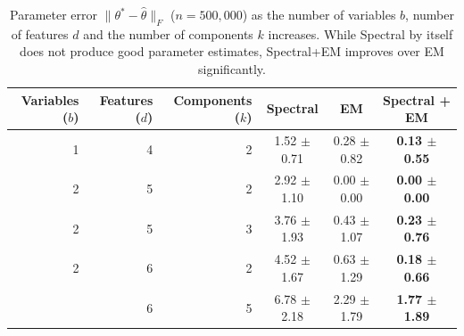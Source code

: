 \begin{table}[p]
\caption{Parameter error $\|\theta^* - \hat \theta\|_F$ ($n = 500,000$)
as the number of variables $b$, number of features $d$ and the number of components $k$ increases.
While Spectral by itself does not produce good parameter estimates, Spectral+EM improves
over EM significantly.
}
\label{tbl:parameter-recovery}
\vskip 0.15in
\begin{center}
\begin{small}
\begin{sc}

  \begin{tabular}{ r r r c c c }
\hline
\abovespace\belowspace
Variables ($b$) & Features ($d$) & Components ($k$) & Spectral & EM & Spectral + EM \\
\hline
\abovespace
  1 & 4 & 2 & 1.52 $\pm$ 0.71 & 0.28 $\pm$ 0.82 & {\bf 0.13 $\pm$ 0.55} \\
  2 & 5 & 2 & 2.92 $\pm$ 1.10 & 0.00 $\pm$ 0.00 & {\bf 0.00 $\pm$ 0.00} \\
  2 & 5 & 3 & 3.76 $\pm$ 1.93 & 0.43 $\pm$ 1.07 & {\bf 0.23 $\pm$ 0.76} \\
  2 & 6 & 2 & 4.52 $\pm$ 1.67 & 0.63 $\pm$ 1.29 & {\bf 0.18 $\pm$ 0.66} \\
\belowspace
  2 & 6 & 5 & 6.78 $\pm$ 2.18 & 2.29 $\pm$ 1.79 & {\bf 1.77 $\pm$ 1.89} \\


\hline

\end{tabular}
\end{sc}
\end{small}
\end{center}
\vskip -0.1in
\end{table}

